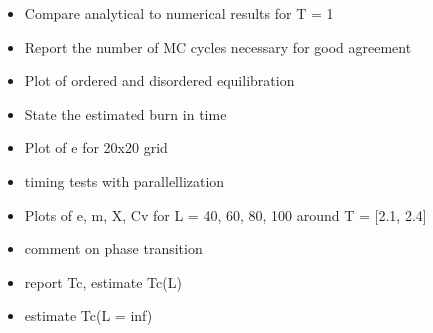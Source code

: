 \begin{itemize}
\item Compare analytical to numerical results for T = 1
\item Report the number of MC cycles necessary for good agreement
\item Plot of ordered and disordered equilibration
\item State the estimated burn in time
\item Plot of e for 20x20 grid
\item timing tests with parallellization
\item Plots of e, m, X, Cv for L = 40, 60, 80, 100 around T = [2.1, 2.4]
\item comment on phase transition
\item report Tc, estimate Tc(L)
\item estimate Tc(L = inf)
\end{itemize}
